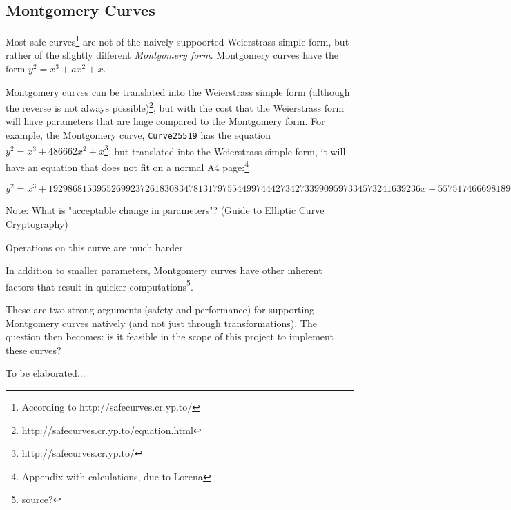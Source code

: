 \subsection{Montgomery Curves}

Most safe curves\footnote{According to http://safecurves.cr.yp.to/} are not of the naively suppoorted
Weierstrass simple form, but rather of the slightly different \emph{Montgomery form}. Montgomery curves
have the form \(y^2 = x^3 + ax^2 + x\).

Montgomery curves can be translated into the Weierstrass simple form (although the reverse is not always
possible)\footnote{http://safecurves.cr.yp.to/equation.html}, but with the cost that the Weierstrass form
will have parameters that are huge compared to the Montgomery form. For example, the Montgomery curve,
\verb|Curve25519| has the equation \(y^2 = x^3+486662x^2+x\)\footnote{http://safecurves.cr.yp.to/}, but
translated into the Weierstrass simple form, it will have an equation that does not fit on a normal A4
page:\footnote{Appendix with calculations, due to Lorena}

\begin{equation}
	y^2 =
	x^3 +
	19298681539552699237261830834781317975544997444273427339909597334573241639236x +
	55751746669818908907645289078257140818241103727901012315294400837956729358436
\end{equation}

Note: What is "acceptable change in parameters"? (Guide to Elliptic Curve Cryptography)

Operations on this curve are much harder.

In addition to smaller parameters, Montgomery curves have other inherent factors that result in quicker
computations\footnote{source?}.

These are two strong arguments (safety and performance) for supporting Montgomery curves natively (and
not just through transformations). The question then becomes: is it feasible in the scope of this
project to implement these curves?

To be elaborated...